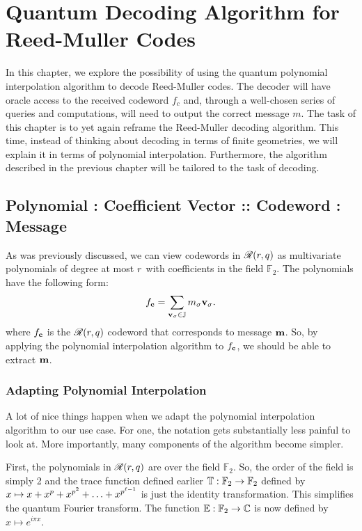 \documentclass[12pt,twoside]{reedthesis}
\theoremstyle{definition}
\newlength{\arrow}
\newcommand{\C}{\mathbb{C}}
\newcommand{\F}{\mathbb{F}}
\begin{document}
\chapter{Quantum Decoding Algorithm for Reed-Muller Codes}

In this chapter, we explore the possibility of using the quantum polynomial interpolation algorithm to decode Reed-Muller codes. The decoder will have oracle access to the received codeword $f_c$ and, through a well-chosen series of queries and computations, will need to output the correct message $m$. The task of this chapter is to yet again reframe the Reed-Muller decoding algorithm. This time, instead of thinking about decoding in terms of finite geometries, we will explain it in terms of polynomial interpolation. Furthermore, the algorithm described in the previous chapter will be tailored to the task of decoding.
 
\section{Polynomial : Coefficient Vector :: Codeword : Message}
As was previously discussed, we can view codewords in $\mathscr{R}(r, q)$ as multivariate polynomials of degree at most $r$ with coefficients in the field $\F_2$. The polynomials have the following form:
\begin{equation}
f_\mathbf{c} = \sum_{\mathbf{v}_{\sigma} \in \mathbb{J}} m_{\sigma} \mathbf{v}_{\sigma} .
\end{equation}
where $f_\mathbf{c}$ is the $\mathscr{R}(r,q)$ codeword that corresponds to message $\mathbf{m}$. So, by applying the polynomial interpolation algorithm to $f_\mathbf{c}$, we should be able to extract $\mathbf{m}$. 


\subsection{Adapting Polynomial Interpolation}
A lot of nice things happen when we adapt the polynomial interpolation algorithm to our use case. For one, the notation gets substantially less painful to look at. More importantly, many components of the algorithm become simpler.

First, the polynomials in $\mathscr{R}(r,q)$ are over the field $\F_2$. So, the order of the field is simply 2 and the trace function defined earlier $\tracef:\F_2 \rightarrow \F_2$ defined by $x \mapsto x + x^p + x^{p^2} + \ldots + x^{p^{\ell-1}}$ is just the identity transformation. This simplifies the quantum Fourier transform. The function $\expf: \F_2 \rightarrow \C$ is now defined by $x \longmapsto e^{i\pi x}$.
\end{document}
